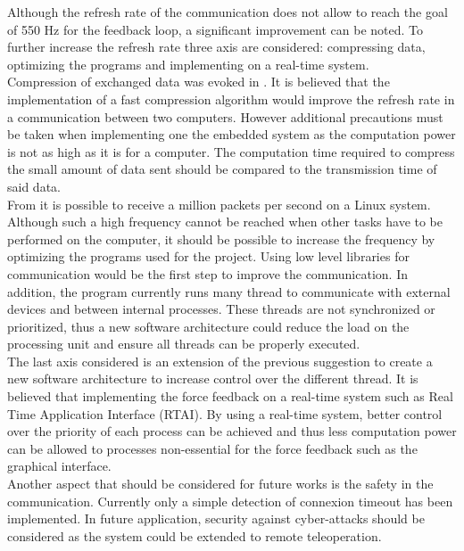 Although the refresh rate of the communication does not allow to reach the goal of 550 Hz for the feedback loop, a significant improvement can be noted.  To further increase the refresh rate three axis are considered: compressing data, optimizing the programs and implementing on a real-time system.\\
Compression of exchanged data was evoked in . It is believed that the implementation of a fast compression algorithm would improve the refresh rate in a communication between two computers. However additional precautions must be taken when implementing one the embedded system as the computation power is not as high as it is for a computer. The computation time required to compress the small amount of data sent should be compared to the transmission time of said data.\\
From \cite{million_packets} it is possible to receive a million packets per second on a Linux system. Although such a high frequency cannot be reached when other tasks have to be performed on the computer, it should be possible to increase the frequency by optimizing the programs used for the project. Using low level libraries for communication would be the first step to improve the communication. In addition, the program currently runs many thread to communicate with external devices and between internal processes. These threads are not synchronized or prioritized, thus a new software architecture could reduce the load on the processing unit and ensure all threads can be properly executed.\\
The last axis considered is an extension of the previous suggestion to create a new software architecture to increase control over the different thread. It is believed that implementing the force feedback on a real-time system such as Real Time Application Interface (RTAI). By using a real-time system, better control over the priority of each process can be achieved and thus less computation power can be allowed to processes non-essential for the force feedback such as the graphical interface.\\
Another aspect that should be considered for future works is the safety in the communication. Currently only a simple detection of connexion timeout has been implemented. In future application, security against cyber-attacks should be considered as the system could be extended to remote teleoperation.
